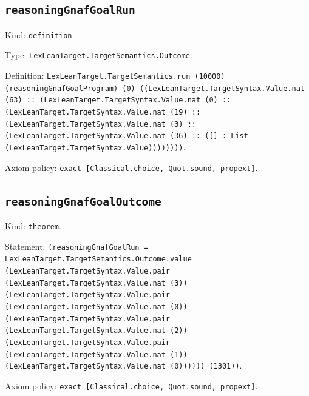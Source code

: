 \documentclass[11pt]{article}
\begin{document}
\subsection*{\texttt{reasoningGnafGoalRun}}
\noindent Kind: \texttt{definition}.\par
\noindent Type: \texttt{LexLeanTarget.TargetSemantics.Outcome}.\par
\noindent Definition: \texttt{LexLeanTarget.TargetSemantics.run (10000) (reasoningGnafGoalProgram) (0) ((LexLeanTarget.TargetSyntax.Value.nat (63) :: (LexLeanTarget.TargetSyntax.Value.nat (0) :: (LexLeanTarget.TargetSyntax.Value.nat (19) :: (LexLeanTarget.TargetSyntax.Value.nat (3) :: (LexLeanTarget.TargetSyntax.Value.nat (36) :: ([] : List (LexLeanTarget.TargetSyntax.Value))))))))}.\par
\noindent Axiom policy: \texttt{exact [Classical.choice, Quot.sound, propext]}.\par
\subsection*{\texttt{reasoningGnafGoalOutcome}}
\noindent Kind: \texttt{theorem}.\par
\noindent Statement: \texttt{(reasoningGnafGoalRun = LexLeanTarget.TargetSemantics.Outcome.value (LexLeanTarget.TargetSyntax.Value.pair (LexLeanTarget.TargetSyntax.Value.nat (3)) (LexLeanTarget.TargetSyntax.Value.pair (LexLeanTarget.TargetSyntax.Value.nat (0)) (LexLeanTarget.TargetSyntax.Value.pair (LexLeanTarget.TargetSyntax.Value.nat (2)) (LexLeanTarget.TargetSyntax.Value.pair (LexLeanTarget.TargetSyntax.Value.nat (1)) (LexLeanTarget.TargetSyntax.Value.nat (0)))))) (1301))}.\par
\noindent Axiom policy: \texttt{exact [Classical.choice, Quot.sound, propext]}.\par
\end{document}
